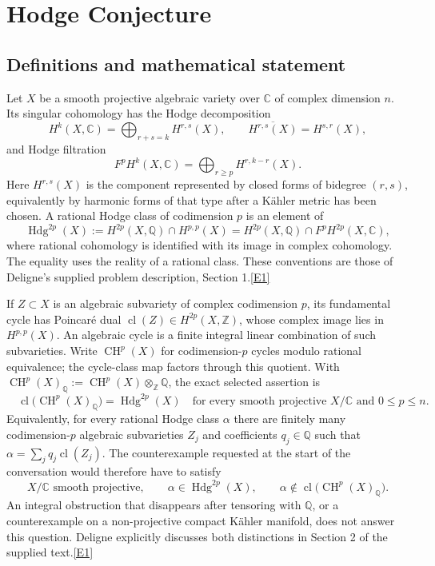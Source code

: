 \documentclass[11pt]{article}
\newcommand{\Q}{\mathbb Q}
\newcommand{\Z}{\mathbb Z}
\newcommand{\C}{\mathbb C}
\newcommand{\cl}{\operatorname{cl}}
\newcommand{\CH}{\operatorname{CH}}
\newcommand{\src}[1]{\hyperlink{src:#1}{[#1]}}
\begin{document}
\section*{\texorpdfstring{Hodge Conjecture}{Hodge Conjecture}}\label{hodge}\label{statement}
\subsection{Definitions and mathematical statement}
Let $X$ be a smooth projective algebraic variety over $\C$ of complex dimension
$n$. Its singular cohomology has the Hodge decomposition
\[
 H^k(X,\C)=\bigoplus_{r+s=k}H^{r,s}(X),\qquad
 \overline{H^{r,s}(X)}=H^{s,r}(X),
\]
and Hodge filtration
\[
 F^pH^k(X,\C)=\bigoplus_{r\ge p}H^{r,k-r}(X).
\]
Here $H^{r,s}(X)$ is the component represented by closed forms of bidegree
$(r,s)$, equivalently by harmonic forms of that type after a K\"ahler metric
has been chosen. A rational Hodge class of codimension $p$ is an element of
\[
 \operatorname{Hdg}^{2p}(X)
 :=H^{2p}(X,\Q)\cap H^{p,p}(X)
 =H^{2p}(X,\Q)\cap F^pH^{2p}(X,\C),
\]
where rational cohomology is identified with its image in complex cohomology.
The equality uses the reality of a rational class. These conventions are those
of Deligne's supplied problem description, Section 1.\src{E1}

If $Z\subset X$ is an algebraic subvariety of complex codimension $p$, its
fundamental cycle has Poincar\'e dual
$\cl(Z)\in H^{2p}(X,\Z)$, whose complex image lies in $H^{p,p}(X)$.
An algebraic cycle is a finite integral linear combination of such
subvarieties. Write $\CH^p(X)$ for codimension-$p$ cycles modulo rational
equivalence; the cycle-class map factors through this quotient. With
$\CH^p(X)_{\Q}:=\CH^p(X)\otimes_{\Z}\Q$, the exact selected assertion is
\begin{equation}\label{hodge:statement}
 \boxed{\quad
 \cl\bigl(\CH^p(X)_{\Q}\bigr)=\operatorname{Hdg}^{2p}(X)
 \quad\text{for every smooth projective }X/\C\text{ and }0\le p\le n.
 \quad}
\end{equation}
Equivalently, for every rational Hodge class $\alpha$ there are finitely many
codimension-$p$ algebraic subvarieties $Z_j$ and coefficients $q_j\in\Q$ such
that $\alpha=\sum_jq_j\cl(Z_j)$. The counterexample requested at the start of
the conversation would therefore have to satisfy
\begin{equation}\label{hodge:counterexample}
 X/\C\text{ smooth projective},\qquad
 \alpha\in\operatorname{Hdg}^{2p}(X),\qquad
 \alpha\notin\cl\bigl(\CH^p(X)_{\Q}\bigr).
\end{equation}
An integral obstruction that disappears after tensoring with $\Q$, or a
counterexample on a non-projective compact K\"ahler manifold, does not answer
this question. Deligne explicitly discusses both distinctions in Section 2
of the supplied text.\src{E1}
\end{document}
